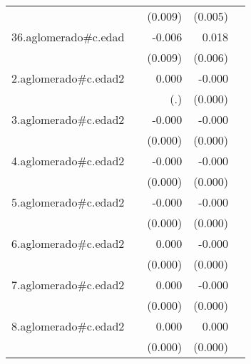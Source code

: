 {\begin{longtable}{l*{4}{D{.}{.}{-1}}}
            &                     &     (0.009)         &     (0.005)         &                     \\
\addlinespace
36.aglomerado#c.edad&                     &      -0.006         &       0.018\sym{**} &                     \\
            &                     &     (0.009)         &     (0.006)         &                     \\
\addlinespace
2.aglomerado#c.edad2&                     &       0.000         &      -0.000         &                     \\
            &                     &         (.)         &     (0.000)         &                     \\
\addlinespace
3.aglomerado#c.edad2&                     &      -0.000         &      -0.000\sym{**} &                     \\
            &                     &     (0.000)         &     (0.000)         &                     \\
\addlinespace
4.aglomerado#c.edad2&                     &      -0.000         &      -0.000\sym{***}&                     \\
            &                     &     (0.000)         &     (0.000)         &                     \\
\addlinespace
5.aglomerado#c.edad2&                     &      -0.000         &      -0.000         &                     \\
            &                     &     (0.000)         &     (0.000)         &                     \\
\addlinespace
6.aglomerado#c.edad2&                     &       0.000         &      -0.000         &                     \\
            &                     &     (0.000)         &     (0.000)         &                     \\
\addlinespace
7.aglomerado#c.edad2&                     &       0.000         &      -0.000         &                     \\
            &                     &     (0.000)         &     (0.000)         &                     \\
\addlinespace
8.aglomerado#c.edad2&                     &       0.000         &       0.000         &                     \\
            &                     &     (0.000)         &     (0.000)         &                     \\

\end{longtable}}
